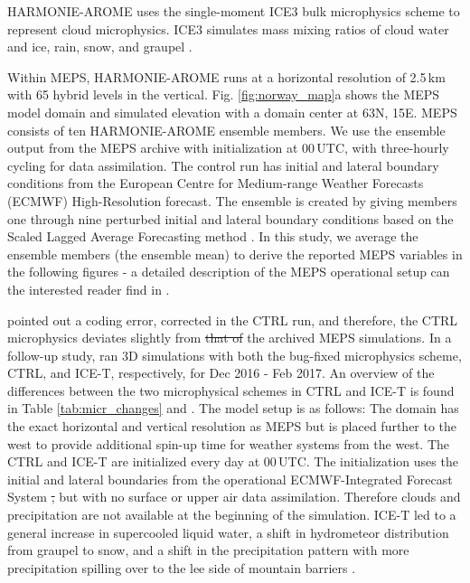 \documentclass{ametsocV5}
\providecommand{\DIFdel}[1]{{\protect\color{red}\sout{#1}}}                      %
\providecommand{\DIFdelbegin}{} %
\providecommand{\DIFdelend}{} %
\newcommand{\DIFscaledelfig}{0.5}
\newlength{\DIFdelgraphicswidth} %
\newlength{\DIFdelgraphicsheight} %
\newcommand{\DIFdelincludegraphics}[2][]{%
\sbox{\DIFdelgraphicsbox}{\DIFOincludegraphics[#1]{#2}}%
\settoboxwidth{\DIFdelgraphicswidth}{\DIFdelgraphicsbox} %
\settoboxtotalheight{\DIFdelgraphicsheight}{\DIFdelgraphicsbox} %
\scalebox{\DIFscaledelfig}{%
\parbox[b]{\DIFdelgraphicswidth}{\usebox{\DIFdelgraphicsbox}\\[-\baselineskip] \rule{\DIFdelgraphicswidth}{0em}}\llap{\resizebox{\DIFdelgraphicswidth}{\DIFdelgraphicsheight}{%
\setlength{\unitlength}{\DIFdelgraphicswidth}%
\begin{picture}(1,1)%
\thicklines\linethickness{2pt} %
{\color[rgb]{1,0,0}\put(0,0){\framebox(1,1){}}}%
{\color[rgb]{1,0,0}\put(0,0){\line( 1,1){1}}}%
{\color[rgb]{1,0,0}\put(0,1){\line(1,-1){1}}}%
\end{picture}%
}\hspace*{3pt}}} %
} %
\DeclareRobustCommand{\DIFdelbegin}{\DIFOdelbegin \let\includegraphics\DIFdelincludegraphics} %
\DeclareRobustCommand{\DIFdelend}{\DIFOaddend \let\includegraphics\DIFOincludegraphics} %
\begin{document}
		HARMONIE-AROME uses the single-moment ICE3 bulk microphysics scheme \citep{caniaux_numerical_1994,pinty_mixed-phased_1998} to represent cloud microphysics. ICE3 simulates mass mixing ratios of cloud water and ice, rain, snow, and graupel \citep{cohard_comprehensive_2000, cohard_comprehensive_2000-1}.

		Within MEPS, HARMONIE-AROME runs at a horizontal resolution of 2.5\,km with 65 hybrid levels in the vertical. Fig. \ref{fig:norway_map}a shows the MEPS model domain and simulated elevation with a domain center at 63\textdegree N, 15\textdegree E. MEPS consists of ten HARMONIE-AROME ensemble members. We use the ensemble output from the MEPS archive with initialization at 00\,UTC, with three-hourly cycling for data assimilation. The control run has initial and lateral boundary conditions from the European Centre for Medium-range Weather Forecasts (ECMWF) High-Resolution forecast. The ensemble is created by giving members one through nine perturbed initial and lateral boundary conditions based on the Scaled Lagged Average Forecasting method \citep{koltzow_metcoop_2017}. In this study, we average the ensemble members (the ensemble mean) to derive the reported MEPS variables in the following figures - a detailed description of the MEPS operational setup can the interested reader find in \citet{frogner_convection-permitting_2019}. 

	 	\citet{engdahl_effects_2020} pointed out a coding error, corrected in the CTRL run, and therefore, the CTRL microphysics deviates slightly from \DIFdelbegin \DIFdel{that of }\DIFdelend the archived MEPS simulations. In a follow-up study, \citet{engdahl_effects_2020} ran 3D simulations with both the bug-fixed microphysics scheme, CTRL, and ICE-T, respectively, for Dec 2016 - Feb 2017. An overview of the differences between the two microphysical schemes in CTRL and ICE-T is found in Table \ref{tab:micr_changes} and \citet{engdahl_improving_2020}. The \citet{engdahl_effects_2020} model setup is as follows: The domain has the exact horizontal and vertical resolution as MEPS but is placed further to the west to provide additional spin-up time for weather systems from the west. The CTRL and ICE-T are initialized every day at 00\,UTC. The initialization uses the initial and lateral boundaries from the operational ECMWF-Integrated Forecast System \DIFdelbegin \DIFdel{, }\DIFdelend but with no surface or upper air data assimilation. Therefore clouds and precipitation are not available at the beginning of the simulation. ICE-T led to a general increase in supercooled liquid water, a shift in hydrometeor distribution from graupel to snow, and a shift in the precipitation pattern with more precipitation spilling over to the lee side of mountain barriers \citep{engdahl_effects_2020}.
\end{document}
